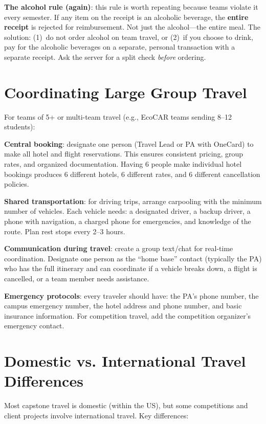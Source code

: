 \textbf{The alcohol rule (again)}: this rule is worth repeating because teams violate it every semester. If any item on the receipt is an alcoholic beverage, the \textbf{entire receipt} is rejected for reimbursement. Not just the alcohol---the entire meal. The solution: (1)~do not order alcohol on team travel, or (2)~if you choose to drink, pay for the alcoholic beverages on a separate, personal transaction with a separate receipt. Ask the server for a split check \emph{before} ordering.

\section{Coordinating Large Group Travel}
For teams of 5+ or multi-team travel (e.g., EcoCAR teams sending 8--12 students):

\textbf{Central booking}: designate one person (Travel Lead or PA with OneCard) to make all hotel and flight reservations. This ensures consistent pricing, group rates, and organized documentation. Having 6 people make individual hotel bookings produces 6 different hotels, 6 different rates, and 6 different cancellation policies.

\textbf{Shared transportation}: for driving trips, arrange carpooling with the minimum number of vehicles. Each vehicle needs: a designated driver, a backup driver, a phone with navigation, a charged phone for emergencies, and knowledge of the route. Plan rest stops every 2--3 hours.

\textbf{Communication during travel}: create a group text/chat for real-time coordination. Designate one person as the ``home base'' contact (typically the PA) who has the full itinerary and can coordinate if a vehicle breaks down, a flight is cancelled, or a team member needs assistance.

\textbf{Emergency protocols}: every traveler should have: the PA's phone number, the campus emergency number, the hotel address and phone number, and basic insurance information. For competition travel, add the competition organizer's emergency contact.



\section{Domestic vs. International Travel Differences}
Most capstone travel is domestic (within the US), but some competitions and client projects involve international travel. Key differences:

